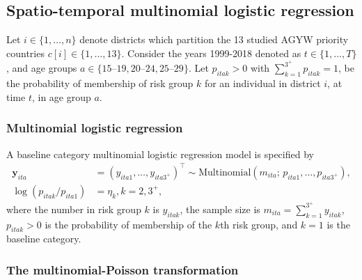 \documentclass[a4paper, nobind]{templates/ociamthesis}
\newcommand{\y}{\mathbf{y}}
\begin{document}
\hypertarget{spatio-temporal-multinomial-logistic-regression}{%
\subsection{Spatio-temporal multinomial logistic regression}\label{spatio-temporal-multinomial-logistic-regression}}

Let \(i \in \{1, \ldots, n\}\) denote districts which partition the 13 studied AGYW priority countries \(c[i] \in \{1, \ldots, 13\}\).
Consider the years 1999-2018 denoted as \(t \in \{1, \ldots, T\}\), and age groups \(a \in \{\text{15--19}, \text{20--24}, \text{25--29}\}\).
Let \(p_{itak} > 0\) with \(\sum_{k = 1}^{3^{+}} p_{itak} = 1\), be the probability of membership of risk group \(k\) for an individual in district \(i\), at time \(t\), in age group \(a\).

\hypertarget{multinomial-logistic-regression}{%
\subsubsection{Multinomial logistic regression}\label{multinomial-logistic-regression}}

A baseline category multinomial logistic regression model is specified by
\begin{align}
    \y_{ita} &= (y_{ita1}, \ldots, y_{ita3^{+}})^\top \sim \text{Multinomial}(m_{ita}; \, p_{ita1}, \ldots, p_{ita3^{+}}), \\
    \log(p_{itak} / p_{ita1}) &= \eta_k, k = 2, 3^{+},
\end{align}
where the number in risk group \(k\) is \(y_{itak}\), the sample size is \(m_{ita} = \sum_{k = 1}^{3^{+}} y_{itak}\), \(p_{itak} > 0\) is the probability of membership of the \(k\)th risk group, and \(k = 1\) is the baseline category.

\hypertarget{the-multinomial-poisson-transformation}{%
\subsubsection{The multinomial-Poisson transformation}\label{the-multinomial-poisson-transformation}}
\end{document}
